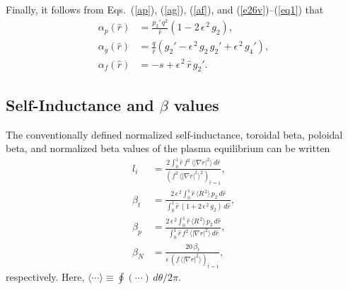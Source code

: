 \documentclass[12pt,prb,aps]{revtex4-1}
\begin{document}
Finally, it follows from Eqs.~(\ref{ap}), (\ref{ag}), (\ref{af}), and (\ref{e26v})--(\ref{eq1}) that
\begin{align}
\alpha_p(\hat{r}) &= \frac{p_2'\,q^2}{\hat{r}}\left(1-2\,\epsilon^{\,2}\,g_2\right),\\[0.5ex]
\alpha_g(\hat{r}) &= \frac{q}{\hat{r}}\left(g_2' -\epsilon^{\,2}\,g_2\,g_2'+\epsilon^{\,2}\,g_4'\right),\\[0.5ex]
\alpha_f(\hat{r}) &= -s + \epsilon^{\,2}\,\hat{r}\,g_2'.
\end{align}

\subsection{Self-Inductance and $\beta$ values}
The conventionally defined normalized self-inductance, toroidal beta, poloidal beta, and normalized beta values of the plasma equilibrium 
can be written\,\cite{gs1}
\begin{align}
l_i&= \frac{2\int_0^1 \hat{r}\,f^2\,\langle |\nabla r|^2\rangle\,d\hat{r}}{(f^2\,\langle|\nabla r|^2\rangle^2)_{\hat{r}=1}},\\[0.5ex]
\beta_t &=  \frac{2\,\epsilon^{\,2}\int_0^1 \hat{r}\,\langle R^{\,2}\rangle\,p_2\,d\hat{r}}{\int_0^1 \hat{r}\,(1+2\,\epsilon^{\,2}\,g_2)\,d\hat{r}},\\[0.5ex]
\beta_p &=  \frac{2\,\epsilon^{\,2}\int_0^1 \hat{r}\,\langle R^{\,2}\rangle\,p_2\,d\hat{r}}
{\int_0^1\hat{r}\,f^2\,\langle|\nabla r|^2\rangle\,d\hat{r}},\\[0.5ex]
\beta_N &=  \frac{20\,\beta_t}
{\epsilon\,(f\,\langle|\nabla r|^2\rangle)_{\hat{r}=1}},
\end{align}
respectively. Here, $\langle\cdots\rangle \equiv \oint (\cdots)\,d\theta/2\pi$.
\end{document}
